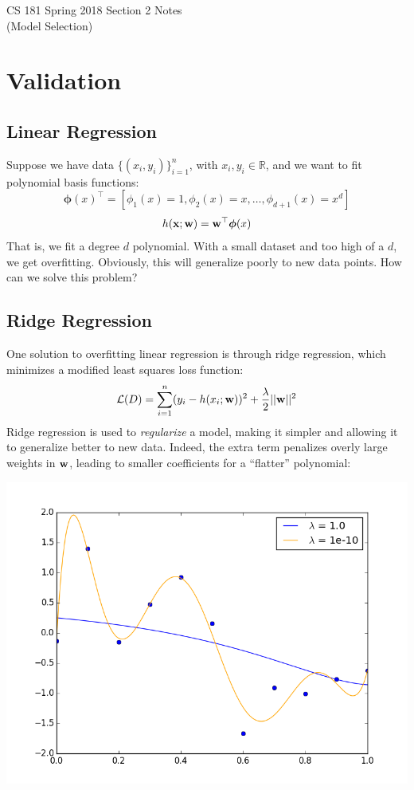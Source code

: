 \documentclass[12pt,letterpaper]{article}
\newcommand{\boldphi}{\boldsymbol{\phi}}
\begin{document}
\begin{center}
\LARGE{CS 181 Spring 2018 Section 2 Notes}\\
(Model Selection)
\end{center}

\section{Validation}

\subsection{Linear Regression}

Suppose we have data $\{(x_i, y_i)\}_{i=1}^n$, with $x_i, y_i\in \mathbb{R}$, 
and we want to fit polynomial basis functions:
%
$$\boldphi(x)^\top = [\phi_1(x) = 1, \phi_2(x) = x, \ldots, \phi_{d+1}(x) = x^d]$$
$$h(\boldx; \boldw) = \boldw^\top\boldphi(x)$$
That is, we fit a degree $d$ polynomial. With a small dataset and too high of a $d$, we get overfitting. Obviously, this will generalize poorly to new data points. How can we solve this problem?

\subsection{Ridge Regression}

One solution to overfitting linear regression is through ridge regression, which minimizes a modified least squares loss function:
$$\mathcal{L}(D) = \sum_{i=1}^n (y_i - h(x_i; \mathbf{w}))^2 + \frac\lambda 2 ||\mathbf{w}||^2$$
Ridge regression is used to \emph{regularize} a model, making it simpler and allowing it to generalize better to new data. Indeed, the extra term penalizes overly large weights in $\mathbf{w}$, leading to smaller coefficients for a ``flatter'' polynomial:
\begin{center}
\includegraphics[scale=0.5]{regression}
\end{center}
\end{document}
